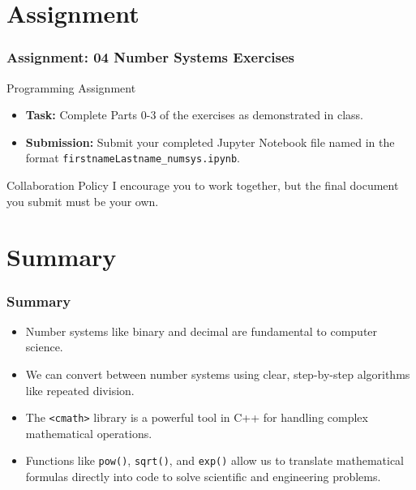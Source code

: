 \documentclass{beamer}
\begin{document}
\section{Assignment}
\begin{frame}
\frametitle{Assignment: 04 Number Systems Exercises}
\begin{block}{Programming Assignment}
    \begin{itemize}
        \item \textbf{Task:} Complete Parts 0-3 of the exercises as demonstrated in class.
        \item \textbf{Submission:} Submit your completed Jupyter Notebook file named in the format \alert{\texttt{firstnameLastname\_numsys.ipynb}}.
    \end{itemize}
\end{block}
\vfill
\begin{alertblock}{Collaboration Policy}
I encourage you to work together, but the final document you submit must be your own.
\end{alertblock}
\end{frame}

\section{Summary}

\begin{frame}
\frametitle{Summary}
\begin{itemize}
    \item Number systems like \alert{binary} and \alert{decimal} are fundamental to computer science.
    \item We can convert between number systems using clear, step-by-step algorithms like \alert{repeated division}.
    \item The \texttt{<cmath>} library is a powerful tool in C++ for handling complex mathematical operations.
    \item Functions like \texttt{pow()}, \texttt{sqrt()}, and \texttt{exp()} allow us to translate mathematical formulas directly into code to solve scientific and engineering problems.
\end{itemize}
\end{frame}
\end{document}
